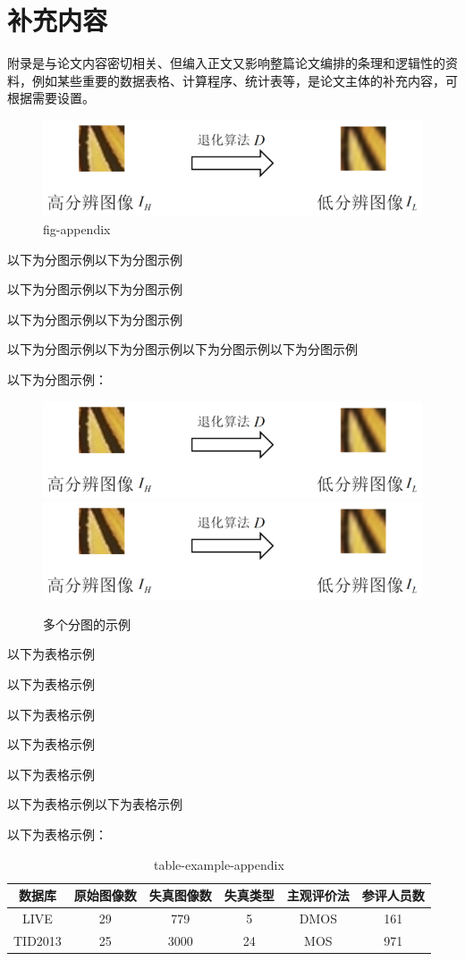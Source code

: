\chapter{补充内容}

附录是与论文内容密切相关、但编入正文又影响整篇论文编排的条理和逻辑性的资料，例如某些重要的数据表格、计算程序、统计表等，是论文主体的补充内容，可根据需要设置。

\begin{figure}[htbp]
  \centering
  \includegraphics[width=0.42\linewidth]{./content/test.png}
  \caption{fig-appendix}
  \label{fig:fig-appendix}
\end{figure}

以下为分图示例以下为分图示例

以下为分图示例以下为分图示例

以下为分图示例以下为分图示例

以下为分图示例以下为分图示例以下为分图示例以下为分图示例

以下为分图示例：

\begin{figure}[htbp]
  \centering
    {\includegraphics[width=0.4\linewidth]{./content/test.png}}
    {\includegraphics[width=0.4\linewidth]{./content/test.png}}
  \caption{多个分图的示例}
  \label{fig:multi-image}
\end{figure}

以下为表格示例

以下为表格示例

以下为表格示例

以下为表格示例

以下为表格示例

以下为表格示例以下为表格示例

以下为表格示例：

\begin{table}[htbp]
  \centering
  \caption{table-example-appendix}
  \begin{tabular}{cccccc}
    \toprule
    数据库  & 原始图像数 & 失真图像数 & 失真类型 & 主观评价法 & 参评人员数 \\
    \midrule
    LIVE    & 29         & 779        & 5       & DMOS       & 161        \\
    TID2013 & 25         & 3000       & 24      & MOS        & 971        \\
    \bottomrule
  \end{tabular}
  \label{tab:table-example-appendix}
\end{table}

